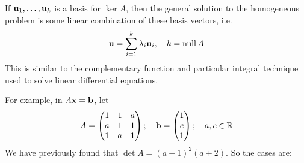 \documentclass{article}
\begin{document}
If $\vb u_1, \dots, \vb u_k$ is a basis for $\ker A$, then the general solution to the homogeneous problem is some linear combination of these basis vectors, i.e.
\[ \vb u = \sum_{i=1}^k \lambda_i \vb u_i,\quad k = \operatorname{null} A \]
This is similar to the complementary function and particular integral technique used to solve linear differential equations.

For example, in $A\vb x = \vb b$, let
\[ A = \begin{pmatrix}
		1 & 1 & a \\ a & 1 & 1 \\ 1 & a & 1
	\end{pmatrix};\quad \vb b = \begin{pmatrix}
		1 \\ c \\ 1
	\end{pmatrix};\quad a, c \in \mathbb R \]
We have previously found that $\det A = (a-1)^2(a+2)$. So the cases are:
\end{document}
